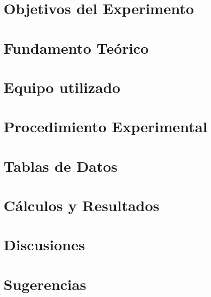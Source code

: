 \documentclass[12pt,a4paper]{article}
\begin{document}

\pagestyle{fancy}
\fancyfoot{}
\fancyfoot[R]{\textit{\thepage}}
\tableofcontents

\newpage
\section{Objetivos del Experimento} %

\section{Fundamento Teórico} %

\section{Equipo utilizado} %

\section{Procedimiento Experimental} %

\section{Tablas de Datos} %

\section{Cálculos y Resultados} %

\section{Discusiones} %

\section{Sugerencias} %

\end{document}
